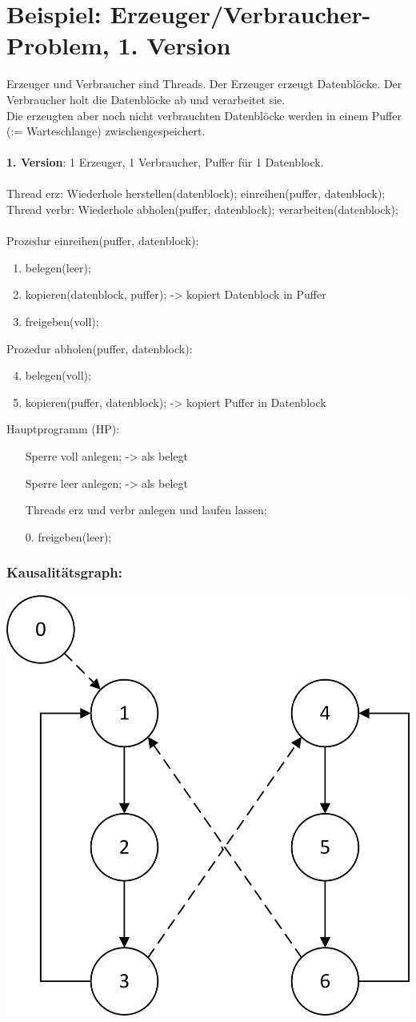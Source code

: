 \section[Beispiel: Erzeuger/Verbraucher (1)]{Beispiel: Erzeuger/Verbraucher-Problem, 1. Version}
Erzeuger und Verbraucher sind Threads. Der Erzeuger erzeugt Datenblöcke. Der Verbraucher holt die Datenblöcke ab und verarbeitet sie.\\
Die erzeugten aber noch nicht verbrauchten Datenblöcke werden in einem Puffer (:= Warteschlange) zwischengespeichert.\\
\\
\textbf{1. Version}: 1 Erzeuger, 1 Verbraucher, Puffer für 1 Datenblock.\\
\\ %
Thread erz:
	Wiederhole
		herstellen(datenblock);
		einreihen(puffer, datenblock);
Thread verbr:
	Wiederhole
		abholen(puffer, datenblock);
		verarbeiten(datenblock);\\
\\
Prozedur einreihen(puffer, datenblock):
\begin{enumerate}
	\item belegen(leer);
	\item kopieren(datenblock, puffer); -> kopiert Datenblock in Puffer
	\item freigeben(voll);
\end{enumerate}
Prozedur abholen(puffer, datenblock):
\begin{enumerate}
	\setcounter{enumi}{3}
	\item belegen(voll);
	\item kopieren(puffer, datenblock); -> kopiert Puffer in Datenblock
\end{enumerate}
Hauptprogramm (HP):
\begin{enumerate}
	\item[] Sperre voll anlegen; -> als belegt
	\item[] Sperre leer anlegen; -> als belegt
	\item[] Threads erz und verbr anlegen und laufen lassen;
	\item[0.] freigeben(leer);
\end{enumerate}

\subsubsection*{Kausalitätsgraph:}
\includegraphics[width=.4\textwidth]{SynchronisationKausalitaetsgraph}


